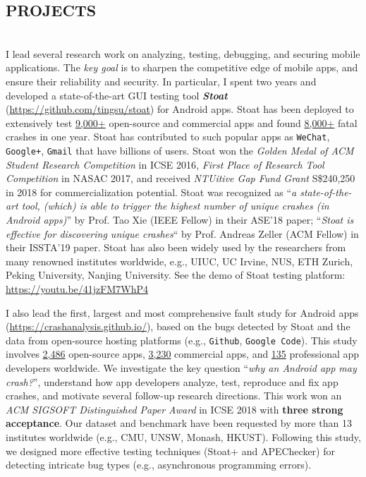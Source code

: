 \documentclass[margin]{res}
\begin{document}
\begin{resume}
\section{PROJECTS}
\\
I lead several research work on analyzing, testing, debugging, and securing mobile applications. The \emph{key goal} is to sharpen the competitive edge of mobile apps, and ensure their reliability and security.
In particular, I spent two years and developed a state-of-the-art GUI testing tool \emph{\textbf{Stoat}} (\url{https://github.com/tingsu/stoat}) for Android apps.
Stoat has been deployed to extensively test \underline{9,000+} open-source and commercial apps and found \underline{8,000+} fatal crashes in one year. Stoat has contributed to such popular apps as \texttt{WeChat}, \texttt{Google+}, \texttt{Gmail} that have billions of users. Stoat won the \emph{Golden Medal of ACM Student Research Competition} in ICSE 2016, \emph{First Place of Research Tool Competition} in NASAC 2017, and received \emph{NTUitive Gap Fund Grant} S\$240,250 in 2018 for commercialization potential. Stoat was recognized as ``\emph{a state-of-the-art tool, (which) is able to trigger the highest number of unique crashes (in Android apps)}'' by Prof. Tao Xie (IEEE Fellow) in their ASE'18 paper; ``\emph{Stoat is effective for discovering unique
crashes}`` by Prof. Andreas Zeller (ACM Fellow) in their ISSTA'19 paper.
Stoat has also been widely used by the researchers from many renowned institutes worldwide, e.g., UIUC, UC Irvine, NUS, ETH Zurich, Peking University, Nanjing University. See the demo of Stoat testing platform: \url{https://youtu.be/41jzFM7WhP4}

I also lead the first, largest and most comprehensive fault study for Android apps (\url{https://crashanalysis.github.io/}), based on the bugs detected by Stoat and the data from open-source hosting platforms (e.g., \texttt{Github}, \texttt{Google Code}). This study involves \underline{2,486} open-source apps, \underline{3,230} commercial apps, and \underline{135} professional app developers worldwide. We investigate the key question ``\emph{why an Android app may crash?}'', understand how app developers analyze, test, reproduce and fix app crashes, and motivate several follow-up research directions. This work won an \emph{ACM SIGSOFT Distinguished Paper Award} in ICSE 2018 with \textbf{three strong acceptance}. Our dataset and benchmark have been requested by more than 13 institutes worldwide (e.g., CMU, UNSW, Monash, HKUST). Following this study, we designed more effective testing techniques (Stoat+ and APEChecker) for detecting intricate bug types (e.g., asynchronous programming errors).


\end{resume}
\end{document}
